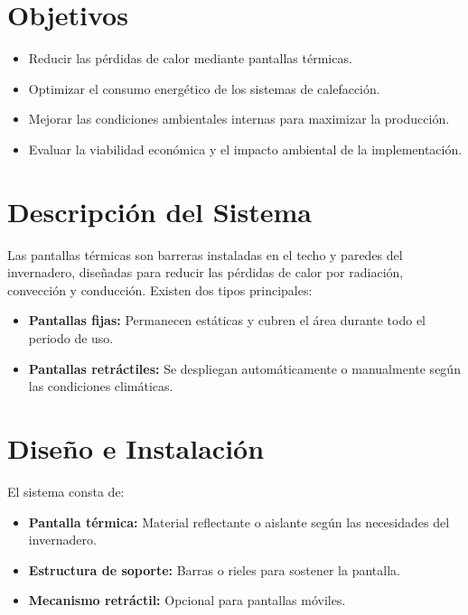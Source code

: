 \begin{Form}
\section{Objetivos}
\begin{itemize}
    \item Reducir las pérdidas de calor mediante pantallas térmicas.
    \item Optimizar el consumo energético de los sistemas de calefacción.
    \item Mejorar las condiciones ambientales internas para maximizar la producción.
    \item Evaluar la viabilidad económica y el impacto ambiental de la implementación.
\end{itemize}

\section{Descripción del Sistema}
Las pantallas térmicas son barreras instaladas en el techo y paredes del invernadero, diseñadas para reducir las pérdidas de calor por radiación, convección y conducción. Existen dos tipos principales:
\begin{itemize}
    \item \textbf{Pantallas fijas:} Permanecen estáticas y cubren el área durante todo el periodo de uso.
    \item \textbf{Pantallas retráctiles:} Se despliegan automáticamente o manualmente según las condiciones climáticas.
\end{itemize}

\section{Diseño e Instalación}
El sistema consta de:
\begin{itemize}
    \item \textbf{Pantalla térmica:} Material reflectante o aislante según las necesidades del invernadero.
    \item \textbf{Estructura de soporte:} Barras o rieles para sostener la pantalla.
    \item \textbf{Mecanismo retráctil:} Opcional para pantallas móviles.
\end{itemize}



    


\begin{center}

    \begin{tikzpicture}[scale=.63]


\end{tikzpicture}
\end{center}
\end{Form}
